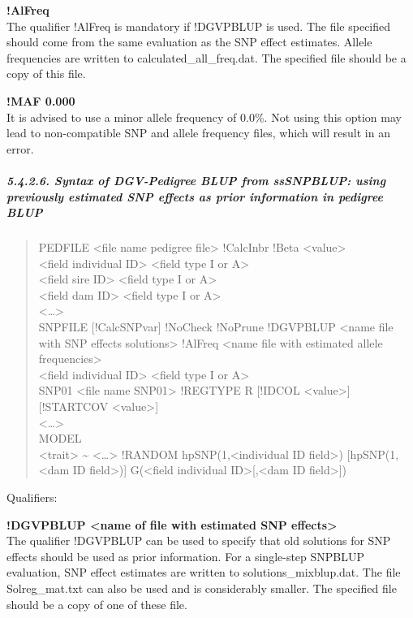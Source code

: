 \textbf{!AlFreq }\\
The qualifier !AlFreq is mandatory if !DGVPBLUP is used. The file
specified should come from the same evaluation as the SNP effect
estimates. Allele frequencies are written to calculated\_all\_freq.dat.
The specified file should be a copy of this file.

\textbf{!MAF 0.000}\\
It is advised to use a minor allele frequency of 0.0\%. Not using this
option may lead to non-compatible SNP and allele frequency files, which
will result in an error.

\subparagraph{5.4.2.6. Syntax of DGV-Pedigree BLUP from ssSNPBLUP: using
previously estimated SNP effects as prior information in pedigree
BLUP}\label{Gene49}

\begin{quote}
PEDFILE \textless file name pedigree file\textgreater{} !CalcInbr !Beta
\textless value\textgreater{}\\
\textless field individual ID\textgreater{} \textless field type I or
A\textgreater{}\\
\textless field sire ID\textgreater{} \textless field type I or
A\textgreater{}\\
\textless field dam ID\textgreater{} \textless field type I or
A\textgreater{}\\
\textless\ldots\textgreater{}\\
SNPFILE {[}!CalcSNPvar{]} !NoCheck !NoPrune !DGVPBLUP \textless name
file with SNP effects solutions\textgreater{} !AlFreq \textless name
file with estimated allele frequencies\textgreater{}\\
\textless field individual ID\textgreater{} \textless field type I or
A\textgreater{}\\
SNP01 \textless file name SNP01\textgreater{} !REGTYPE R {[}!IDCOL
\textless value\textgreater{]} {[}!STARTCOV
\textless value\textgreater{]}\\
\textless\ldots\textgreater{}\\
MODEL\\
\textless trait\textgreater{} \textasciitilde{}
\textless\ldots\textgreater{} !RANDOM hpSNP(1,\textless individual ID
field\textgreater) {[}hpSNP(1,\textless dam ID field\textgreater){]}
G(\textless field individual ID\textgreater{[},\textless dam ID
field\textgreater{]})
\end{quote}

Qualifiers:

\textbf{!DGVPBLUP \textless name of file with estimated SNP
effects\textgreater{}}\\
The qualifier !DGVPBLUP can be used to specify that old solutions for
SNP effects should be used as prior information. For a single-step
SNPBLUP evaluation, SNP effect estimates are written to
solutions\_mixblup.dat. The file Solreg\_mat.txt can also be used and is
considerably smaller. The specified file should be a copy of one of
these file.

